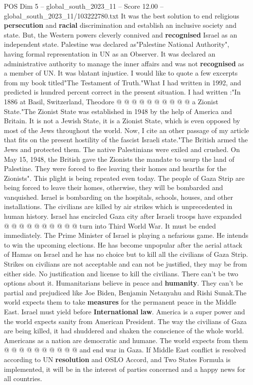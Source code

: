 \begin{textsample}{POS Dim 5 – global\_south\_2023\_11 – Score 12.00 – global\_south\_2023\_11/103222780.txt}
It was the best solution to end religious \textbf{persecution} and \textbf{racial} discrimination and establish an inclusive society and state.
But, the Western powers cleverly connived and \textbf{recognised} Israel as an independent state.
Palestine was declared as"Palestine National Authority", having formal representation in UN as an Observer.
It was declared an administrative authority to manage the inner affairs and was not \textbf{recognised} as a member of UN.
It was blatant injustice.
I would like to quote a few excerpts from my book titled"The Testament of Truth."What I had written in 1992, and predicted is hundred percent correct in the present situation.
I had written :"In 1886 at Basil, Switzerland, Theodore @ @ @ @ @ @ @ @ @ @ a Zionist State."The Zionist State was established in 1948 by the help of America and Britain.
It is not a Jewish State, it is a Zionist State, which is even opposed by most of the Jews throughout the world.
Now, I cite an other passage of my article that fits on the present hostility of the fascist Israeli state."The British armed the Jews and protected them.
The native Palestinians were exiled and crushed.
On May 15, 1948, the British gave the Zionists the mandate to usurp the land of Palestine.
They were forced to flee leaving their homes and hearths for the Zionists".
This plight is being repeated even today.
The people of Gaza Strip are being forced to leave their homes, otherwise, they will be bombarded and vanquished.
Israel is bombarding on the hospitals, schools, houses, and other installations.
The civilians are killed by air strikes which is unprecedented in human history.
Israel has encircled Gaza city after Israeli troops have expanded @ @ @ @ @ @ @ @ @ @ turn into Third World War.
It must be ended immediately.
The Prime Minister of Israel is playing a nefarious game.
He intends to win the upcoming elections.
He has become unpopular after the aerial attack of Hamas on Israel and he has no choice but to kill all the civilians of Gaza Strip.
Strikes on civilians are not acceptable and can not be justified, they may be from either side.
No justification and license to kill the civilians.
There can't be two options about it.
Humanitarians believe in peace and \textbf{humanity}.
They can't be partial and prejudiced like Joe Biden, Benjamin Netanyahu and Rishi Sunak.The world expects them to take \textbf{measures} for the permanent peace in the Middle East.
Israel must yield before \textbf{International} \textbf{law}.
America is a super power and the world expects sanity from American President.
The way the civilians of Gaza are being killed, it had shuddered and shaken the conscience of the whole world.
Americans as a nation are democratic and humane.
The world expects from them @ @ @ @ @ @ @ @ @ @ and end war in Gaza.
If Middle East conflict is resolved according to UN \textbf{resolution} and OSLO Accord, and Two States Formula is implemented, it will be in the interest of parties concerned and a happy news for all countries.

\end{textsample}
